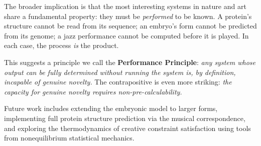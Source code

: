 \documentclass[11pt,a4paper]{article}
\begin{document}
The broader implication is that the most interesting systems in nature and art share a fundamental property: they must be \emph{performed} to be known. A protein's structure cannot be read from its sequence; an embryo's form cannot be predicted from its genome; a jazz performance cannot be computed before it is played. In each case, the process \emph{is} the product.

This suggests a principle we call the \textbf{Performance Principle}: \emph{any system whose output can be fully determined without running the system is, by definition, incapable of genuine novelty.} The contrapositive is even more striking: \emph{the capacity for genuine novelty requires non-pre-calculability.}

Future work includes extending the embryonic model to larger forms, implementing full protein structure prediction via the musical correspondence, and exploring the thermodynamics of creative constraint satisfaction using tools from nonequilibrium statistical mechanics.



\end{document}
